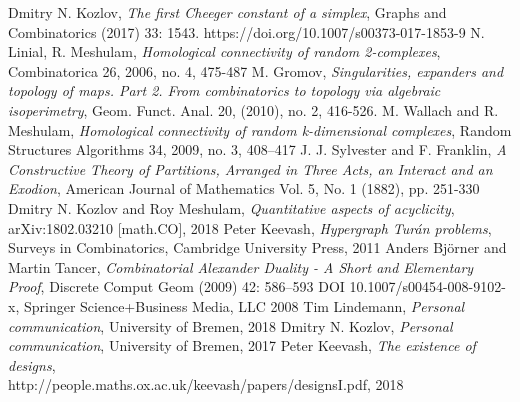 \documentclass[11pt,english,onehalfspacing,headsepline]{MastersDoctoralThesis}
\begin{document}
\begin{thebibliography}{1}
Dmitry N. Kozlov, \textit{The first Cheeger constant of a simplex}, Graphs and Combinatorics (2017) 33: 1543. https://doi.org/10.1007/s00373-017-1853-9
N. Linial, R. Meshulam, \textit{Homological connectivity of random 2-complexes}, Combinatorica 26, 2006,
no. 4, 475-487
M. Gromov, \textit{Singularities, expanders and topology of maps. Part 2. From combinatorics to topology
via algebraic isoperimetry}, Geom. Funct. Anal. 20, (2010), no. 2, 416-526.
M. Wallach and R. Meshulam, \textit{Homological connectivity of random k-dimensional complexes}, Random Structures Algorithms 34, 2009, no. 3, 408–417
J. J. Sylvester and F. Franklin, \textit{A Constructive Theory of Partitions, Arranged in Three Acts, an Interact and an Exodion}, American Journal of Mathematics
Vol. 5, No. 1 (1882), pp. 251-330
 Dmitry N. Kozlov and Roy Meshulam, \textit{Quantitative aspects of acyclicity}, arXiv:1802.03210 [math.CO], 2018
 Peter Keevash, \textit{Hypergraph Tur\'{a}n problems}, Surveys in Combinatorics, Cambridge University Press, 2011
 Anders Björner and Martin Tancer, \textit{Combinatorial Alexander Duality - A Short and Elementary Proof}, Discrete Comput Geom (2009) 42: 586–593 DOI 10.1007/s00454-008-9102-x, Springer Science+Business Media, LLC 2008
 Tim Lindemann, \textit{Personal communication}, University of Bremen, 2018
 Dmitry N. Kozlov, \textit{Personal communication}, University of Bremen, 2017
 Peter Keevash, \textit{The existence of designs},\\http://people.maths.ox.ac.uk/keevash/papers/designsI.pdf, 2018
\end{thebibliography}
\end{document}
